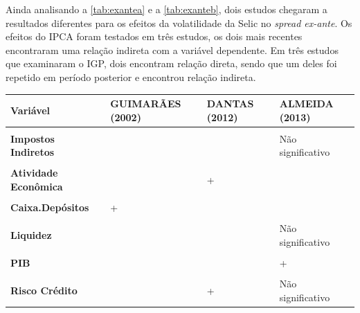 \documentclass[12pt,12pt,openright,oneside,a4paper,chapter=TITLE,section=TITLE,subsection=TITLE,subsubsection=TITLE,english,french,spanish,portugues,sumario=tradicional]{abntex2}
\begin{document}
Ainda analisando a \autoref{tab:exantea} e a \autoref{tab:exanteb}, dois
estudos chegaram a resultados diferentes para os efeitos da volatilidade da
Selic no \emph{spread ex-ante}. Os efeitos do IPCA foram testados em três estudos,
os dois mais recentes encontraram uma relação indireta com a variável
dependente. Em três estudos que examinaram o IGP, dois encontram relação
direta, sendo que um deles foi repetido em período posterior e encontrou relação indireta.

\begin{table}
\caption{Resumo de estudos sobre o \emph{spread ex-post} no Brasil}
\begin{table}[H]
\centering\begingroup\fontsize{10}{12}\selectfont

\begin{tabular}[t]{>{\raggedright\arraybackslash}p{4cm}>{\raggedright\arraybackslash}p{3cm}>{\raggedright\arraybackslash}p{3cm}>{\raggedright\arraybackslash}p{3cm}}
\toprule
Variável & GUIMARÃES (2002) & DANTAS (2012) & ALMEIDA (2013)\\
\midrule
\textbf{\cellcolor{gray!6}{Custos Administrativos}} & \cellcolor{gray!6}{} & \cellcolor{gray!6}{} & \cellcolor{gray!6}{+}\\
\textbf{Impostos Indiretos} &  &  & Não significativo\\
\textbf{\cellcolor{gray!6}{Requerimento de Reserva}} & \cellcolor{gray!6}{} & \cellcolor{gray!6}{} & \cellcolor{gray!6}{+}\\
\textbf{Atividade Econômica} &  & + & \\
\textbf{\cellcolor{gray!6}{Bancos Estrangeiros}} & \cellcolor{gray!6}{+} & \cellcolor{gray!6}{} & \cellcolor{gray!6}{}\\
\addlinespace
\textbf{Caixa.Depósitos} & + &  & \\
\textbf{\cellcolor{gray!6}{Grau Concentração}} & \cellcolor{gray!6}{} & \cellcolor{gray!6}{+} & \cellcolor{gray!6}{+}\\
\textbf{Liquidez} &  &  & Não significativo\\
\textbf{\cellcolor{gray!6}{Market Share}} & \cellcolor{gray!6}{} & \cellcolor{gray!6}{-} & \cellcolor{gray!6}{+}\\
\textbf{PIB} &  &  & +\\
\addlinespace
\textbf{\cellcolor{gray!6}{Receita Serviços}} & \cellcolor{gray!6}{} & \cellcolor{gray!6}{} & \cellcolor{gray!6}{-}\\
\textbf{Risco Crédito} &  & + & Não significativo\\
\bottomrule
\end{tabular}
\endgroup{}
\end{table}
\label{tab:expost}
\end{table}
\end{document}
